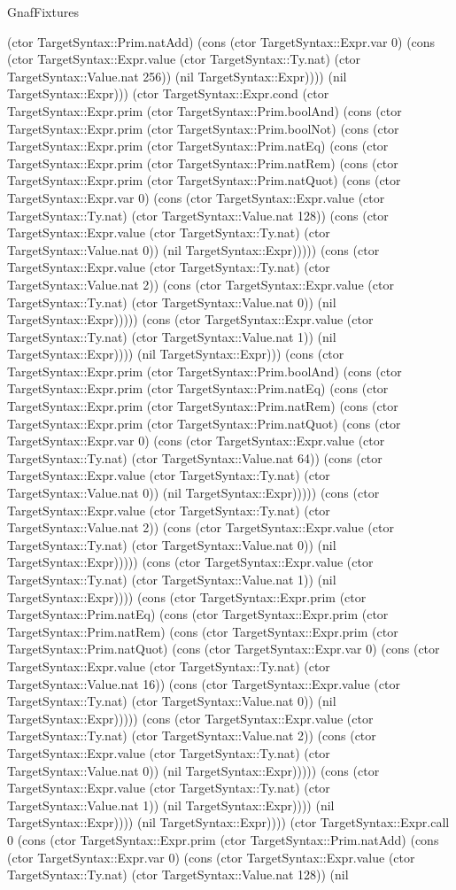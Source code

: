 \begin{lexlean}{GnafFixtures}
\begin{semanticmodule}
{(ctor TargetSyntax::Prim.natAdd) (cons (ctor TargetSyntax::Expr.var 0) (cons (ctor TargetSyntax::Expr.value (ctor TargetSyntax::Ty.nat) (ctor TargetSyntax::Value.nat 256)) (nil TargetSyntax::Expr)))) (nil TargetSyntax::Expr))) (ctor TargetSyntax::Expr.cond (ctor TargetSyntax::Expr.prim (ctor TargetSyntax::Prim.boolAnd) (cons (ctor TargetSyntax::Expr.prim (ctor TargetSyntax::Prim.boolNot) (cons (ctor TargetSyntax::Expr.prim (ctor TargetSyntax::Prim.natEq) (cons (ctor TargetSyntax::Expr.prim (ctor TargetSyntax::Prim.natRem) (cons (ctor TargetSyntax::Expr.prim (ctor TargetSyntax::Prim.natQuot) (cons (ctor TargetSyntax::Expr.var 0) (cons (ctor TargetSyntax::Expr.value (ctor TargetSyntax::Ty.nat) (ctor TargetSyntax::Value.nat 128)) (cons (ctor TargetSyntax::Expr.value (ctor TargetSyntax::Ty.nat) (ctor TargetSyntax::Value.nat 0)) (nil TargetSyntax::Expr))))) (cons (ctor TargetSyntax::Expr.value (ctor TargetSyntax::Ty.nat) (ctor TargetSyntax::Value.nat 2)) (cons (ctor TargetSyntax::Expr.value (ctor TargetSyntax::Ty.nat) (ctor TargetSyntax::Value.nat 0)) (nil TargetSyntax::Expr))))) (cons (ctor TargetSyntax::Expr.value (ctor TargetSyntax::Ty.nat) (ctor TargetSyntax::Value.nat 1)) (nil TargetSyntax::Expr)))) (nil TargetSyntax::Expr))) (cons (ctor TargetSyntax::Expr.prim (ctor TargetSyntax::Prim.boolAnd) (cons (ctor TargetSyntax::Expr.prim (ctor TargetSyntax::Prim.natEq) (cons (ctor TargetSyntax::Expr.prim (ctor TargetSyntax::Prim.natRem) (cons (ctor TargetSyntax::Expr.prim (ctor TargetSyntax::Prim.natQuot) (cons (ctor TargetSyntax::Expr.var 0) (cons (ctor TargetSyntax::Expr.value (ctor TargetSyntax::Ty.nat) (ctor TargetSyntax::Value.nat 64)) (cons (ctor TargetSyntax::Expr.value (ctor TargetSyntax::Ty.nat) (ctor TargetSyntax::Value.nat 0)) (nil TargetSyntax::Expr))))) (cons (ctor TargetSyntax::Expr.value (ctor TargetSyntax::Ty.nat) (ctor TargetSyntax::Value.nat 2)) (cons (ctor TargetSyntax::Expr.value (ctor TargetSyntax::Ty.nat) (ctor TargetSyntax::Value.nat 0)) (nil TargetSyntax::Expr))))) (cons (ctor TargetSyntax::Expr.value (ctor TargetSyntax::Ty.nat) (ctor TargetSyntax::Value.nat 1)) (nil TargetSyntax::Expr)))) (cons (ctor TargetSyntax::Expr.prim (ctor TargetSyntax::Prim.natEq) (cons (ctor TargetSyntax::Expr.prim (ctor TargetSyntax::Prim.natRem) (cons (ctor TargetSyntax::Expr.prim (ctor TargetSyntax::Prim.natQuot) (cons (ctor TargetSyntax::Expr.var 0) (cons (ctor TargetSyntax::Expr.value (ctor TargetSyntax::Ty.nat) (ctor TargetSyntax::Value.nat 16)) (cons (ctor TargetSyntax::Expr.value (ctor TargetSyntax::Ty.nat) (ctor TargetSyntax::Value.nat 0)) (nil TargetSyntax::Expr))))) (cons (ctor TargetSyntax::Expr.value (ctor TargetSyntax::Ty.nat) (ctor TargetSyntax::Value.nat 2)) (cons (ctor TargetSyntax::Expr.value (ctor TargetSyntax::Ty.nat) (ctor TargetSyntax::Value.nat 0)) (nil TargetSyntax::Expr))))) (cons (ctor TargetSyntax::Expr.value (ctor TargetSyntax::Ty.nat) (ctor TargetSyntax::Value.nat 1)) (nil TargetSyntax::Expr)))) (nil TargetSyntax::Expr)))) (nil TargetSyntax::Expr)))) (ctor TargetSyntax::Expr.call 0 (cons (ctor TargetSyntax::Expr.prim (ctor TargetSyntax::Prim.natAdd) (cons (ctor TargetSyntax::Expr.var 0) (cons (ctor TargetSyntax::Expr.value (ctor TargetSyntax::Ty.nat) (ctor TargetSyntax::Value.nat 128)) (nil }
\end{semanticmodule}
\end{lexlean}
